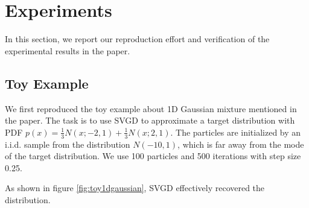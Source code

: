 \section{Experiments}
In this section, we report our reproduction effort and verification of the experimental results in the paper.

\subsection{Toy Example}

We first reproduced the toy example about 1D Gaussian mixture mentioned in the paper. The task is to use SVGD to approximate a target distribution with PDF $p(x) = \frac{1}{3} N(x; -2, 1) + \frac{1}{3} N(x; 2, 1)$. The particles are initialized by an i.i.d. sample from the distribution $N(-10, 1)$, which is far away from the mode of the target distribution. We use 100 particles and 500 iterations with step size 0.25. 

As shown in figure \ref{fig:toy1dgaussian}, SVGD effectively recovered the distribution.


